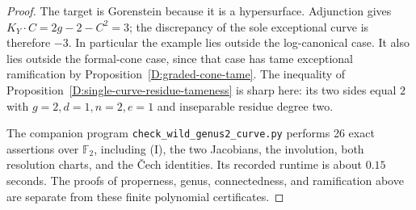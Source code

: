 \begin{proof}
The target is Gorenstein because it is a hypersurface.
Adjunction gives $K_Y\cdot C=2g-2-C^2=3$; the discrepancy
of the sole exceptional curve is therefore $-3$.  In
particular the example lies outside the log-canonical case.
It also lies outside the formal-cone case, since that case
has tame exceptional ramification by
Proposition~\ref{D:graded-cone-tame}.  The inequality of
Proposition~\ref{D:single-curve-residue-tameness} is sharp
here: its two sides equal $2$ with $g=2,d=1,n=2,e=1$
and inseparable residue degree two.

The companion program \texttt{check\_wild\_genus2\_curve.py}
performs 26 exact assertions over $\mathbb F_2$, including
(I), the two Jacobians, the involution, both resolution
charts, and the \v Cech identities.  Its recorded runtime
is about $0.15$ seconds.  The proofs of properness, genus,
connectedness, and ramification above are separate from
these finite polynomial certificates.
\end{proof}
